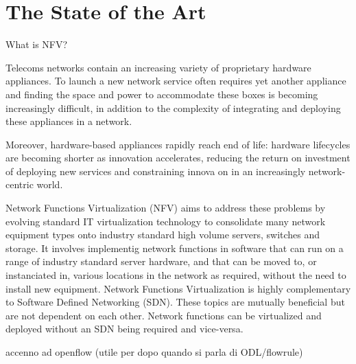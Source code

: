 \chapter{The State of the Art}
\label{chap:State of the Art}
What is NFV?

Telecoms networks contain an increasing variety of proprietary hardware appliances.
To launch a new network service often requires yet another appliance and finding the space and power to accommodate these boxes is becoming increasingly difficult, in addition to the complexity of integrating and deploying these appliances in a network.

Moreover, hardware-based appliances rapidly reach end of life: hardware lifecycles are becoming shorter as innovation accelerates, reducing the return on investment of deploying new services and constraining innova on in an increasingly network-centric world.

Network Functions Virtualization (NFV) aims to address these problems by evolving standard IT virtualization technology to consolidate many network equipment types onto industry standard high volume servers, switches and storage. It involves implementig network functions in software that can run on a range of industry standard server hardware, and that can be moved to, or instanciated in, various locations in the network as required, without the need to install new equipment.
Network Functions Virtualization is highly complementary to Software Defined Networking (SDN).
These topics are mutually beneficial but are not dependent on each other. Network functions can be virtualized and deployed without an SDN being required and vice-versa.

accenno ad openflow (utile per dopo quando si parla di ODL/flowrule)